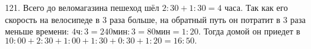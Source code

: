 121. Всего до веломагазина пешеход шёл $2:30+1:30=4$ часа. Так как его скорость на велосипеде в 3 раза больше, на обратный путь он потратит в 3 раза меньше времени: $4\text{ч}:3=240\text{мин}:3=80\text{мин}=1:20.$ Тогда домой он приедет в $10:00+2:30+1:00+1:30+0:30+1:20=16:50.$\\
